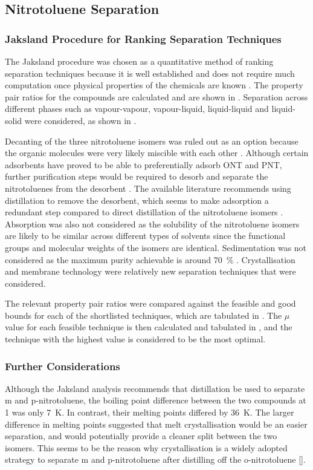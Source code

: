 \subsection{Nitrotoluene Separation}
\label{app:ntol separation}
\subsubsection{Jaksland Procedure for Ranking Separation Techniques}
The Jaksland procedure was chosen as a quantitative method of ranking separation techniques because it is well established and does not require much computation once physical properties of the chemicals are known \cite{jaksland_separation_1995}. The property pair ratios for the compounds are calculated and are shown in . Separation across different phases such as vapour-vapour, vapour-liquid, liquid-liquid and liquid-solid were considered, as shown in .

Decanting of the three nitrotoluene isomers was ruled out as an option because the organic molecules were very likely miscible with each other \cite{merck_solvent_2021}. Although certain adsorbents have proved to be able to preferentially adsorb ONT and PNT, further purification steps would be required to desorb and separate the nitrotoluenes from the desorbent \cite{zhao_new_2016}. The available literature recommends using distillation to remove the desorbent, which seems to make adsorption a redundant step compared to direct distillation of the nitrotoluene isomers \cite{zinnen_ep0181106a2_1984}. Absorption was also not considered as the solubility of the nitrotoluene isomers are likely to be similar across different types of solvents since the functional groups and molecular weights of the isomers are identical. Sedimentation was not considered as the maximum purity achievable is around \SI{70}{\percent} \cite{seider_product_2009}. Crystallisation and membrane technology were relatively new separation techniques that were considered. 

The relevant property pair ratios were compared against the feasible and good bounds for each of the shortlisted techniques, which are tabulated in . The $\mu$ value for each feasible technique is then calculated and tabulated in , and the technique with the highest value is considered to be the most optimal. 

\subsubsection{Further Considerations}
Although the Jaksland analysis recommends that distillation be used to separate m and p-nitrotoluene, the boiling point difference between the two compounds at \SI{1}{\atm} was only \SI{7}{\K}. In contrast, their melting points differed by \SI{36}{\K}. The larger difference in melting points suggested that melt crystallisation would be an easier separation, and would potentially provide a cleaner split between the two isomers. This seems to be the reason why crystallisation is a widely adopted strategy to separate m and p-nitrotoluene after distilling off the o-nitrotoluene []. 

